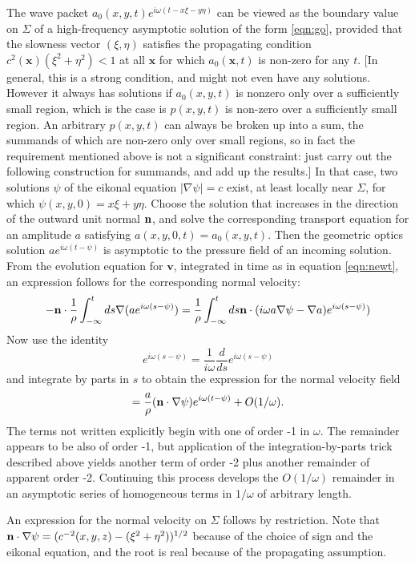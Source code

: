 \documentclass[12pt]{geophysics}
\newcommand{\bx}{\mathbf{x}}
\newcommand{\bv}{\mathbf{v}}
\begin{document}
The wave packet $a_0(x,y,t) e^{i\omega(t-x\xi-y\eta)}$ can be
viewed as the boundary value on $\Sigma$ of a
high-frequency asymptotic solution of the form \ref{eqn:go}, provided that the
slowness vector $(\xi, \eta)$ satisfies the propagating condition
$c^2(\bx)(\xi^2+\eta^2) < 1$ at all $\bx$ for
which $a_0(\bx,t)$ is non-zero for any $t$. [In general, this is a
strong condition, and might not even have any solutions. However it
always has solutions if $a_0(x,y,t)$ is nonzero only over a sufficiently
small region, which is the case is $p(x,y,t)$ is non-zero over a
sufficiently small region. An arbitrary $p(x,y,t)$ can always be
broken up into a sum, the summands of which are non-zero only over
small regions, so in fact the requirement mentioned above is not a
significant constraint: just carry out the following construction for
summands, and add up the results.] In that case, two
solutions $\psi$ of the eikonal equation $|\nabla \psi|=c$ exist, at least locally near
$\Sigma$, for which $\psi(x,y,0)=x\xi+y\eta$. Choose the solution
that increases in the direction of the outward unit normal ${\bf
  n}$, and solve the corresponding transport equation for an
amplitude $a$ satisfying $a(x,y,0,t) = a_0(x,y,t)$. Then the geometric optics solution $a e^{i\omega(t-\psi)}$ is
asymptotic to the pressure field of an incoming solution. From the
evolution equation for $\bv$, integrated in time as in equation
\ref{eqn:newt},  an expression follows for the corresponding normal
velocity:
\[
  -{\bf n} \cdot \frac{1}{\rho}\int_{-\infty}^t ds \nabla (a
  e^{i\omega(s-\psi)})=\frac{1}{\rho}\int_{-\infty}^t ds {\bf n}
  \cdot(i\omega a\nabla \psi -\nabla a) e^{i\omega(s-\psi)})
\]
Now use the identity
\[
  e^{i\omega(s-\psi)} = \frac{1}{i\omega}\frac{d}{ds}e^{i\omega(s-\psi)}
\]
and integrate by parts in $s$ to obtain the expression for
the normal velocity field 
\[
  = \frac{a}{\rho} ({\bf n} \cdot \nabla \psi)  e^{i\omega(t-\psi)} + O(1/\omega).
\]
The terms not written explicitly begin with one of order -1 in
$\omega$. The remainder appears to be also of order -1, but
application of the integration-by-parts trick described above yields
another term of order -2 plus another remainder of apparent order
-2. Continuing this process develops the $O(1/\omega)$ remainder in an
asymptotic series of homogeneous terms in $1/\omega$ of arbitrary
length.

An expression for the normal velocity on
$\Sigma$ follows by restriction. Note that ${\bf n} \cdot \nabla \psi =( c^{-2}(x,y,z)-
(\xi^2+\eta^2))^{1/2}$ because of the choice of sign and the eikonal
equation, and the root is real because of the propagating assumption.
\end{document}
